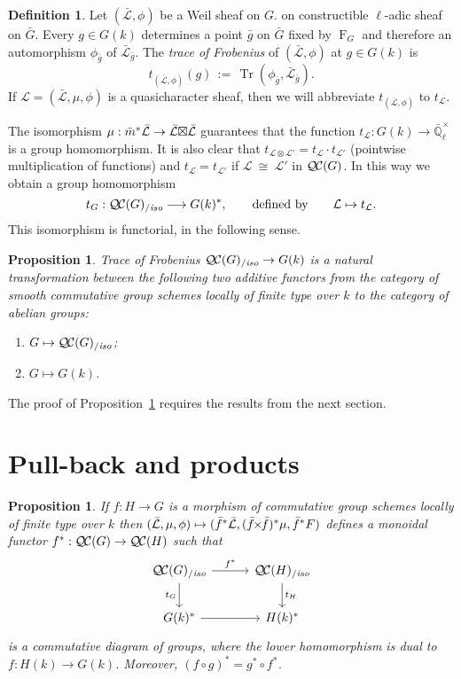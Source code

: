 \documentclass[11pt]{amsart}
\theoremstyle{plain}
\newtheorem{proposition}[theorem]{Proposition}
\theoremstyle{definition}
\newtheorem{definition}[theorem]{Definition}
\theoremstyle{remark}
\newcommand{\EE}{\mathbb{\bar Q}_\ell}
\newcommand{\Fq}{k}
\newcommand{\EEx}{\EE^\times}
\newcommand{\Frob}[1]{\operatorname{F}_{#1}}
\DeclareMathOperator{\Hom}{Hom}
\DeclareMathOperator{\trace}{Tr}
\newcommand{\cdef}[1]{ {#1}\index{#1} }
\newcommand{\ceq}{{\, :=\, }}
\newcommand{\iso}{{\ \cong\ }}
\newcommand{\cs}[1]{{\mathcal{#1}}}
\newcommand{\gcs}[1]{{\mathcal{\bar #1}}}
\newcommand{\QC}{{\mathcal{Q\hskip-0.8pt C}}}
\newcommand{\QCiso}[1]{\QC(#1)_{/\textit{iso}}}
\newcommand{\trFrob}[1]{t_{#1}}
\renewcommand{\bf}{\bar{f}}
\newcommand{\bg}{\bar{g}}
\newcommand{\bm}{\bar{m}}
\newcommand{\bG}{\bar{G}}
\newcommand{\tight}[3]{\hspace{-#1pt}{#2}\hspace{-#3pt}}
\newcommand{\bfxf}{\text{$\bar{f} \tight{1}{\times}{1} \bar{f}$}}
\newcommand{\LxL}{\text{$\gcs{L} \tight{0}{\boxtimes}{0} \gcs{L}$}}
\begin{document}
\begin{definition}\label{def:trFrob}
Let $(\gcs{L},\phi)$ be a Weil sheaf on $G$. on constructible $\ell$-adic sheaf on $\bG$. Every $g\in G(\Fq)$
determines a point $\bg$ on $\bG$ fixed by $\Frob{G}$ and
therefore an automorphism $\phi_{\bg}$ of $\gcs{L}_{\bg}$. The \emph{trace of Frobenius} of $(\gcs{L},\phi)$ at $g\in G(\Fq)$ is 
\[
\trFrob{(\gcs{L},\phi)}(g) \ceq \trace(\phi_{\bg}, \gcs{L}_{\bg}).
\]
If $\cs{L} = (\gcs{L},\mu,\phi)$ is a quasicharacter sheaf, 
then we will abbreviate $\trFrob{(\gcs{L},\phi)}$ to $\trFrob{\cs{L}}$.
\end{definition}

The isomorphism $\mu : \bm^* \gcs{L} \to \LxL$ guarantees 
that the function $\trFrob{\cs{L}} : G(\Fq)\to \EEx$ is a group homomorphism.
It is also clear that $\trFrob{\cs{L}\otimes \cs{L'}} = \trFrob{\cs{L}} \cdot \trFrob{\cs{L'}}$
(pointwise multiplication of functions) and $\trFrob{\cs{L}} = \trFrob{\cs{L'}}$
if $\cs{L} \iso \cs{L'}$ in $\QC(G)$. In this way we obtain a group homomorphism
\[
\cdef{\trFrob{G}} : \QCiso{G} \longrightarrow G(\Fq)^*,
\qquad \text{defined by}\qquad \cs{L} \mapsto \trFrob{\cs{L}}.
\]
This isomorphism is functorial, in the following sense.

\begin{proposition}\label{prop:functorialG}
Trace of Frobenius $\QCiso{G} \to G(\Fq)$ is a natural transformation 
between the following two additive functors from the category of smooth commutative
group schemes locally of finite type over $\Fq$ to the category of abelian groups:
\begin{enumerate}
\item[$F_1$:] $G \mapsto \QCiso{G}$;
\item[$F_2$:] $G \mapsto G(\Fq)$.
\end{enumerate}
\end{proposition}

The proof of Proposition~\ref{prop:functorialG} requires the results from the next section.

\section{Pull-back and products}\label{sec:pullback}

\begin{proposition}\label{prop:pullback}
  If $f : H\to G$ is a morphism of commutative group schemes locally of finite type over $\Fq$ then
  $(\gcs{L},\mu,\phi) \mapsto (\bf^*\gcs{L},(\bfxf)^*\mu,\bf^*F)$
  defines a monoidal functor $f^* : \QC(G) \to \QC(H)$ such that
  \[
  \begin{tikzcd}[row sep=20, column sep=30]
   \QCiso{G} \rar{f^*} \arrow[swap]{d}{\trFrob{G}} & \QCiso{H} \dar{\trFrob{H}} \\
   G(\Fq)^* \rar & H(\Fq)^*
  \end{tikzcd}
  \]
  is a commutative diagram of groups, where the lower homomorphism is
  dual to $f : H(\Fq)\to G(\Fq)$.  Moreover, $(f\circ g)^* = g^* \circ f^*$.
\end{proposition}
\end{document}
